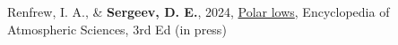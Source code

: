 \item[\small{\highlightdark{\textbf{\textbullet}}}] Renfrew, I. A., \& \textbf{Sergeev, D. E.}, 2024, \href{https://doi.org/10.1016/B978-0-323-96026-7.00102-8}{Polar lows}, Encyclopedia of Atmospheric Sciences, 3rd Ed (in press)